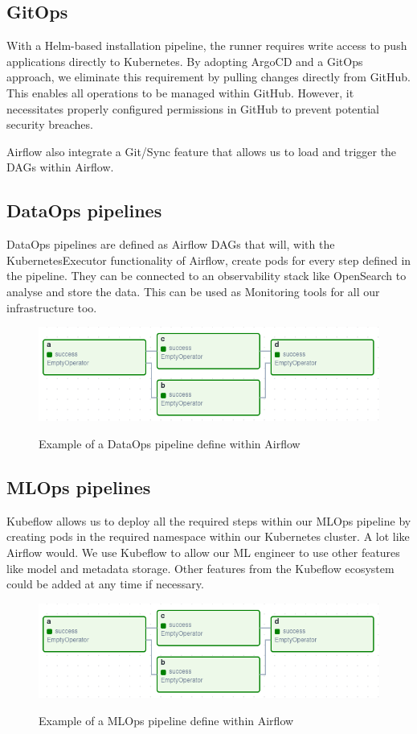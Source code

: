 \subsection{GitOps}
With a Helm-based installation pipeline, the runner requires write access to push applications directly to Kubernetes.
By adopting ArgoCD and a GitOps approach, we eliminate this requirement by pulling changes directly from GitHub.
This enables all operations to be managed within GitHub.
However, it necessitates properly configured permissions in GitHub to prevent potential security breaches.

Airflow also integrate a Git/Sync feature that allows us to load and trigger the DAGs within Airflow.

\subsection{DataOps pipelines}
DataOps pipelines are defined as Airflow DAGs that will, with the KubernetesExecutor functionality of Airflow,
create pods for every step defined in the pipeline.
They can be connected to an observability stack like OpenSearch to analyse and store the data.
This can be used as Monitoring tools for all our infrastructure too.

\begin{figure}[!htbp]
    \centering
    \caption{Example of a DataOps pipeline define within Airflow}
    \includegraphics[scale=0.5]{images/project/data-ops-airflow-dag}
    \label{fig:project-data-ops-airflow-dag}
\end{figure}

\subsection{MLOps pipelines}
Kubeflow allows us to deploy all the required steps within our MLOps pipeline by creating pods in the required namespace within our Kubernetes cluster.
A lot like Airflow would.
We use Kubeflow to allow our ML engineer to use other features like model and metadata storage.
Other features from the Kubeflow ecosystem could be added at any time if necessary.

\begin{figure}[!htbp]
    \centering
    \caption{Example of a MLOps pipeline define within Airflow}
    \includegraphics[scale=0.5]{images/project/data-ops-airflow-dag}
    \label{fig:project-ml-ops-airflow-dag}
\end{figure}

